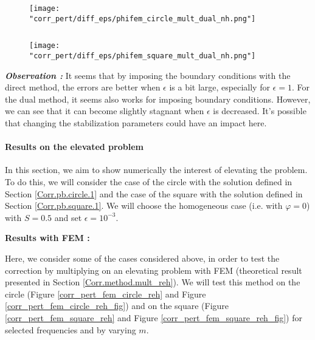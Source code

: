 \begin{enumerate}[label=\textbullet]
	\begin{minipage}{0.48\linewidth}
		\begin{figure}[H]
			\centering
			\texttt{[image: "corr\_pert/diff\_eps/phifem\_circle\_mult\_dual\_nh.png"]}
			\label{corr_pert_phifem_circle_mult_dual_nh}
		\end{figure} 
	\end{minipage} $\qquad$
	\begin{minipage}{0.48\linewidth}
		\begin{figure}[H]
			\centering
			\texttt{[image: "corr\_pert/diff\_eps/phifem\_square\_mult\_dual\_nh.png"]}
			\label{corr_pert_phifem_square_mult_dual_nh}
		\end{figure} 
	\end{minipage}
	
	\textbf{\textit{Observation :}} It seems that by imposing the boundary conditions with the direct method, the errors are better when $\epsilon$ is a bit large, especially for $\epsilon=1$. For the dual method, it seems also works for imposing boundary conditions. However, we can see that it can become slightly stagnant when $\epsilon$ is decreased. It's possible that changing the stabilization parameters could have an impact here.
	
\end{enumerate}

\paragraph{Results on the elevated problem} \label{Corr.results.disturbed.reh} 

In this section, we aim to show numerically the interest of elevating the problem. To do this, we will consider the case of the circle with the solution defined in Section \ref{Corr.pb.circle.1} and the case of the square with the solution defined in Section \ref{Corr.pb.square.1}. We will choose the homogeneous case (i.e. with $\varphi=0$) with $S=0.5$ and set $\epsilon=10^{-3}$.

\textbf{Results with FEM :}

Here, we consider some of the cases considered above, in order to test the correction by multiplying on an elevating problem with FEM (theoretical result presented in Section \ref{Corr.method.mult_reh}). We will test this method on the circle (Figure \ref{corr_pert_fem_circle_reh} and Figure \ref{corr_pert_fem_circle_reh_fig}) and on the square (Figure \ref{corr_pert_fem_square_reh} and Figure \ref{corr_pert_fem_square_reh_fig}) for selected frequencies and by varying $m$.

